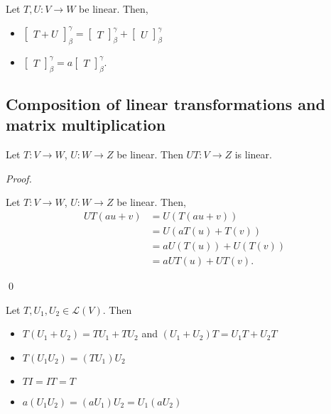 \documentclass[12pt]{article}
\newenvironment{theorem}[2][Theorem]{\begin{trivlist}
\item[\hskip \labelsep {\bfseries #1}\hskip \labelsep {\bfseries #2.}]}{\end{trivlist}}
\newenvironment{sol}
    {\emph{Proof.}
    }
    {
    \qed
    }
\begin{document}
\begin{theorem}{2.8}
Let $T,U : V \to W$ be linear. Then,

\begin{itemize}
    \item $\begin{bmatrix} T+U \end{bmatrix}_\beta^\gamma = \begin{bmatrix} T \end{bmatrix}_\beta^\gamma + \begin{bmatrix} U \end{bmatrix}_\beta^\gamma$
    \item $\begin{bmatrix} T \end{bmatrix}_\beta^\gamma = a\begin{bmatrix} T \end{bmatrix}_\beta^\gamma$.
\end{itemize}
\end{theorem}

\subsection{Composition of linear transformations and matrix multiplication}

\begin{theorem}{2.9}
Let $T : V \to W$, $U : W \to Z$ be linear. Then $UT : V \to Z$ is linear.
\end{theorem}

\begin{sol}
Let $T : V \to W$, $U : W \to Z$ be linear. Then, \begin{align*}
    UT(au + v) &= U(T(au+v)) \\
    &= U(aT(u) + T(v)) \\
    &= aU(T(u)) + U(T(v)) \\
    &= aUT(u) + UT(v).
\end{align*}
\end{sol}

\begin{theorem}{2.10}
Let $T, U_1, U_2 \in \mathcal{L}(V)$. Then 

\begin{itemize}
    \item $T(U_1 + U_2) = TU_1 + TU_2$ and $(U_1 + U_2)T = U_1T + U_2T$
    \item $T(U_1U_2) = (TU_1)U_2$
    \item $TI = IT = T$
    \item $a(U_1U_2) = (aU_1)U_2 = U_1(aU_2)$
\end{itemize}
\end{theorem}
\end{document}
